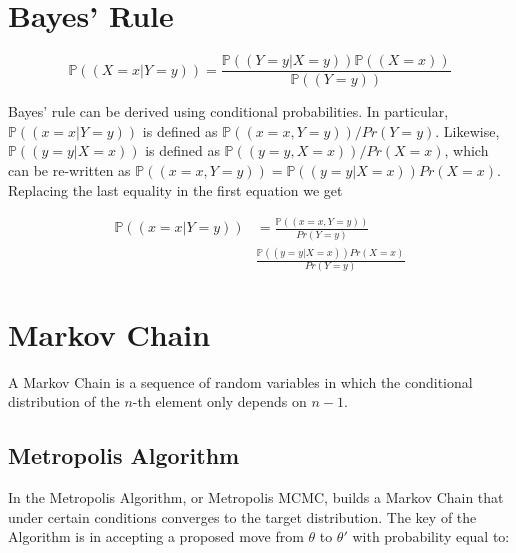 \documentclass[]{book}
\begin{document}
\hypertarget{bayes-rule}{%
\section{Bayes' Rule}\label{bayes-rule}}

\begin{equation}
{\mathbb{P}\left(\left(X=x|Y=y\right)\right) } = \frac{{\mathbb{P}\left(\left(Y=y|X=y\right)\right) }{\mathbb{P}\left(\left(X=x\right)\right) }}{{\mathbb{P}\left(\left(Y=y\right)\right) }}
\end{equation}

Bayes' rule can be derived using conditional probabilities. In particular, \({\mathbb{P}\left(\left(x=x|Y=y\right)\right) }\) is defined as \({\mathbb{P}\left(\left(x=x, Y=y\right)\right) }/Pr{\left(Y=y\right)}\). Likewise, \({\mathbb{P}\left(\left(y=y|X=x\right)\right) }\) is defined as \({\mathbb{P}\left(\left(y=y, X=x\right)\right) }/Pr{\left(X=x\right)}\), which can be re-written as \({\mathbb{P}\left(\left(x=x, Y=y\right)\right) } = {\mathbb{P}\left(\left(y=y|X=x\right)\right) }Pr{\left(X=x\right)}\). Replacing the last equality in the first equation we get

\begin{align*}
{\mathbb{P}\left(\left(x=x|Y=y\right)\right) } & = \frac{{\mathbb{P}\left(\left(x=x, Y=y\right)\right) }}{Pr{\left(Y=y\right)}} \\
& \frac{{\mathbb{P}\left(\left(y=y|X=x\right)\right) }Pr{\left(X=x\right)}}{Pr{\left(Y=y\right)}}
\end{align*}

\hypertarget{markov-chain}{%
\section{Markov Chain}\label{markov-chain}}

A Markov Chain is a sequence of random variables in which the conditional distribution of the \(n\)-th element only depends on \(n-1\).

\hypertarget{metropolis-algorithm}{%
\subsection{Metropolis Algorithm}\label{metropolis-algorithm}}

In the Metropolis Algorithm, or Metropolis MCMC, builds a Markov Chain that
under certain conditions converges to the target distribution. The key of the
Algorithm is in accepting a proposed move from \(\theta\) to \(\theta'\) with
probability equal to:
\end{document}
